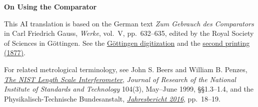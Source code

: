 \clearpage
{}
\begin{center}\textbf{On Using the Comparator}\end{center}
\noindent This AI translation is based on the German text \textit{Zum Gebrauch des Comparators} in Carl Friedrich Gauss, \textit{Werke}, vol.~V, pp.~632--635, edited by the Royal Society of Sciences in Göttingen. See the \href{https://gdz.sub.uni-goettingen.de/id/PPN236006339}{Göttingen digitization} and the \href{https://archive.org/download/Werkecarlf05gausrich/page/n643}{second printing (1877)}.
\par\smallskip\noindent For related metrological terminology, see John S. Beers and William B. Penzes, \href{https://nvlpubs.nist.gov/nistpubs/jres/104/3/html/j43bee.htm#c1pz3}{\textit{The NIST Length Scale Interferometer}}, \textit{Journal of Research of the National Institute of Standards and Technology} 104(3), May--June 1999, §§1.3--1.4, and the Physikalisch-Technische Bundesanstalt, \href{https://oar.ptb.de/files/download/460.2016.pdf}{\textit{Jahresbericht 2016}}, pp.~18--19.
\clearpage
